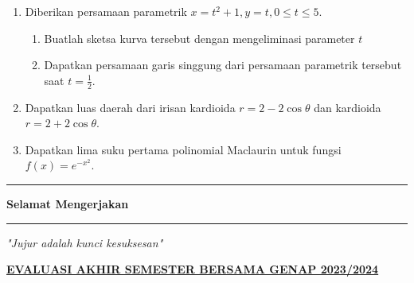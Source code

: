 \documentclass[10pt,openany,a4paper]{article}
\theoremstyle{definition}
\theoremstyle{definition}
\theoremstyle{plain}
\begin{document}
\begin{enumerate}
\begin{center}
\end{center}
    \item Diberikan persamaan parametrik $x=t^2+1, y=t, 0\leq t\leq 5$.
    \begin{enumerate}
        \item Buatlah sketsa kurva tersebut dengan mengeliminasi parameter $t$
        \item Dapatkan persamaan garis singgung dari persamaan parametrik tersebut saat $t=\frac{1}{2}$.
    \end{enumerate}
    \item Dapatkan luas daerah dari irisan kardioida $r=2-2\cos\theta$ dan kardioida $r=2+2\cos\theta$.
    \item Dapatkan lima suku pertama polinomial Maclaurin untuk fungsi $f(x)=e^{-x^2}$.
\end{enumerate}
\vfill
\begin{center}
    \noindent\rule{0.366416\linewidth}{2pt} \textbf{ Selamat Mengerjakan } \rule{0.366416\linewidth}{2pt}
\end{center}
\begin{center}
    \textit{"Jujur adalah kunci kesuksesan"}
\end{center}

\newpage
\begin{center}
	{\underline{\textbf{\MakeUppercase{EVALUASI AKHIR SEMESTER BERSAMA GENAP 2023/2024}}}}
    \end{center}
\end{document}
